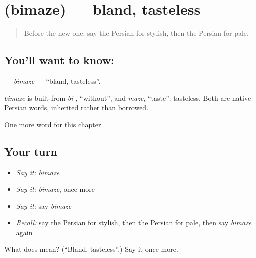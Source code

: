 \section[\texorpdfstring{\fa{بیمزه} (bimaze)}{بیمزه (bimaze)}]{ (bimaze) — bland, tasteless}

\label{lesson:FA-C202-bimaze}



\begin{quote}
Before the new one: say the Persian for stylish, then the Persian for pale.
\end{quote}

\subsection*{You'll want to know: }
\textbf{} — \emph{bimaze} — \textquotedblleft{}bland, tasteless\textquotedblright{}.

\begin{cousinweb}
\emph{bimaze} is built from \emph{bi-}, \textquotedblleft{}without\textquotedblright{}, and \emph{maze}, \textquotedblleft{}taste\textquotedblright{}: tasteless. Both are native Persian words, inherited rather than borrowed.
\end{cousinweb}

\begin{grammarlens}[title={What you've built}]
One more word for this chapter.
\end{grammarlens}

\subsection*{Your turn}
\begin{itemize}
\raggedright
  \item \emph{Say it:} \emph{bimaze}
  \item \emph{Say it:} \emph{bimaze}, once more
  \item \emph{Say it:} say \emph{bimaze}
  \item \emph{Recall:} say the Persian for stylish, then the Persian for pale, then say \emph{bimaze} again
\end{itemize}

\begin{tcolorbox}[breakable,colback=teal!4,colframe=teal!35!black,title={Before you move on}]
What does  mean? (\textquotedblleft{}Bland, tasteless\textquotedblright{}.) Say it once more.
\end{tcolorbox}

